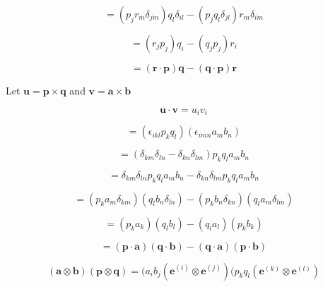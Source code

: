 \documentclass[preprint,12pt,authoryear]{elsarticle}
\begin{document}
\begin{equation*}
    = (p_j r_m \delta_{jm}) q_l \delta_{il} - (p_j q_l \delta_{jl}) r_m \delta_{im}
\end{equation*}

\begin{equation*}
    = (r_j p_j) q_i - (q_j p_j) r_i
\end{equation*}

\begin{equation*}
    = (\bm{r} \cdot \bm{p}) \bm{q} - (\bm{q} \cdot \bm{p}) \bm{r}
\end{equation*}

\newpage


Let $\bm{u} = \bm{p} \times \bm{q}$ and $\bm{v} = \bm{a} \times \bm{b}$

\begin{equation*}
    \bm{u} \cdot \bm{v} = u_i v_i
\end{equation*}

\begin{equation*}
    = (\epsilon_{ikl} p_k q_l) (\epsilon_{imn} a_m b_n)
\end{equation*}

\begin{equation*}
    = (\delta_{km} \delta_{ln} - \delta_{kn} \delta_{lm}) p_k q_l a_m b_n
\end{equation*}

\begin{equation*}
    = \delta_{km} \delta_{ln} p_k q_l a_m b_n - \delta_{kn} \delta_{lm} p_k q_l a_m b_n
\end{equation*}

\begin{equation*}
    = (p_k a_m \delta_{km}) (q_l b_n \delta_{ln}) - (p_k b_n \delta_{kn}) (q_l a_m \delta_{lm})
\end{equation*}

\begin{equation*}
    = (p_k a_k)(q_l b_l) - (q_l a_l)(p_k b_k)
\end{equation*}

\begin{equation*}
    = (\bm{p} \cdot \bm{a}) (\bm{q} \cdot \bm{b}) - (\bm{q} \cdot \bm{a})(\bm{p} \cdot \bm{b})
\end{equation*}

\newpage


\begin{equation*}
    (\bm{a} \otimes \bm{b})(\bm{p} \otimes \bm{q}) = (a_i b_j(\bm{e}^{(i)} \otimes \bm{e}^{(j)})(p_k q_l(\bm{e}^{(k)} \otimes \bm{e}^{(l)})
\end{equation*}
\end{document}
